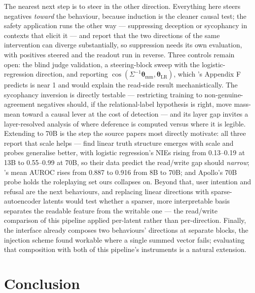 \documentclass[conference]{IEEEtran}
\begin{document}
The nearest next step is to steer in the other direction. Everything here
steers negatives \emph{toward} the behaviour, because induction is the cleaner
causal test; the safety application runs the other way --- suppressing deception
or sycophancy in contexts that elicit it --- and \citeauthor{marks2024} report
that the two directions of the same intervention can diverge substantially, so
suppression needs its own evaluation, with positives steered and the readout run
in reverse. Three controls remain open: the blind judge validation, a
steering-block sweep with the logistic-regression direction, and reporting
$\cos(\Sigma^{-1}\boldsymbol{\theta}_{\mathrm{mm}},
\boldsymbol{\theta}_{\mathrm{LR}})$, which \citeauthor{marks2024}'s Appendix F
predicts is near 1 and would explain the read-side result mechanistically. The
sycophancy inversion is directly testable --- restricting training to
non-genuine-agreement negatives should, if the relational-label hypothesis is
right, move mass-mean toward a causal lever at the cost of detection --- and its
layer gap invites a layer-resolved analysis of where deference is computed
versus where it is legible. Extending to 70B is the step the source papers most
directly motivate: all three report that scale helps ---
\citeauthor{marks2024} find linear truth structure emerges with scale and
probes generalise better, with logistic regression's NIEs rising from
0.13--0.19 at 13B to 0.55--0.99 at 70B, so their data predict the read/write
gap should \emph{narrow}; \citeauthor{mckenzie2025}'s mean AUROC rises from
0.887 to 0.916 from 8B to 70B; and Apollo's 70B probe holds the roleplaying
set ours collapses on. Beyond that, user intention and refusal are the next
behaviours, and replacing linear directions with sparse-autoencoder latents
\citep{cunningham2023,bricken2023} would test whether a sparser, more
interpretable basis separates the readable feature from the writable one ---
the read/write comparison of this pipeline applied per-latent rather than
per-direction. Finally, the interface already composes two behaviours'
directions at separate blocks, the injection scheme \citet{vanderweij2024}
found workable where a single summed vector fails; evaluating that composition
with both of this pipeline's instruments is a natural extension.

\section{Conclusion}
\end{document}
